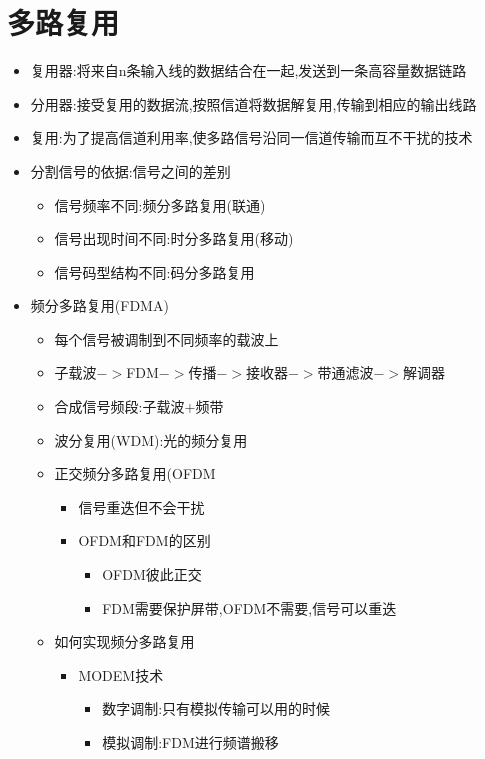 \documentclass[a4paper,12pt,notitlepage]{article}
\begin{document}
\section{多路复用}
\begin{itemize}
	\item 复用器:将来自n条输入线的数据结合在一起,发送到一条高容量数据链路
	\item 分用器:接受复用的数据流,按照信道将数据解复用,传输到相应的输出线路
	\item 复用:为了提高信道利用率,使多路信号沿同一信道传输而互不干扰的技术
	\item 分割信号的依据:信号之间的差别
	\begin{itemize}
		\item 信号频率不同:频分多路复用(联通)
		\item 信号出现时间不同:时分多路复用(移动)
		\item 信号码型结构不同:码分多路复用
	\end{itemize}
	\item 频分多路复用(FDMA)
	\begin{itemize}
		\item 每个信号被调制到不同频率的载波上
		\item 子载波$->$FDM$->$传播$->$接收器$->$带通滤波$->$解调器
		\item 合成信号频段:子载波+频带
		\item 波分复用(WDM):光的频分复用
		\item 正交频分多路复用(OFDM
		\begin{itemize}
			\item 信号重迭但不会干扰
			\item OFDM和FDM的区别
			\begin{itemize}
				\item OFDM彼此正交
				\item FDM需要保护屏带,OFDM不需要,信号可以重迭
			\end{itemize}
		\end{itemize}
		\item 如何实现频分多路复用
		\begin{itemize}
			\item MODEM技术
			\begin{itemize}
				\item 数字调制:只有模拟传输可以用的时候
				\item 模拟调制:FDM进行频谱搬移
			\end{itemize}
		\end{itemize}
	\end{itemize}

\end{itemize}
\end{document}

